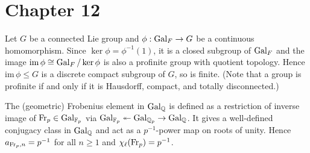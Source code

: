 \newpage
\section{Chapter 12}

\begin{problem}
Let $G$ be a connected Lie group and $\phi : \operatorname{\mathrm{Gal}}_F \to G$ be a continuous homomorphism.
Since $\ker \phi = \phi^{-1}(1)$, it is a closed subgroup of $\operatorname{\mathrm{Gal}}_F$ and the image $\mathrm{im\,}\phi \cong \operatorname{\mathrm{Gal}}_F / \ker \phi$
is also a profinite group with quotient topology.
Hence $\mathrm{im\,}\phi \leq G$ is a discrete compact subgroup of $G$, so is finite.
(Note that a group is profinite if and only if it is Hausdorff, compact, and totally disconnected.)
\end{problem}

\begin{problem}
The (geometric) Frobenius element in $\operatorname{\mathrm{Gal}}_\mathbb{Q}$ is defined as a restriction of inverse image of $\operatorname{\mathrm{Fr}}_p \in \operatorname{\mathrm{Gal}}_{\mathbb{F}_p}$
via $\operatorname{\mathrm{Gal}}_{\mathbb{F}_p} \twoheadleftarrow \operatorname{\mathrm{Gal}}_{\mathbb{Q}_p} \to \operatorname{\mathrm{Gal}}_{\mathbb{Q}}$.
It gives a well-defined conjugacy class in $\operatorname{\mathrm{Gal}}_\mathbb{Q}$ and act as a $p^{-1}$-power map on roots of unity.
Hence $a_{\operatorname{\mathrm{Fr}}_p, n} = p^{-1}$ for all $n \geq 1$ and $\chi_{\ell}(\operatorname{\mathrm{Fr}}_p) = p^{-1}$.
\end{problem}

\begin{problem} \notfinish
\end{problem}

\begin{problem} \notfinish
\end{problem}

\begin{problem} \notfinish
\end{problem}

\begin{problem} \notfinish
\end{problem}

